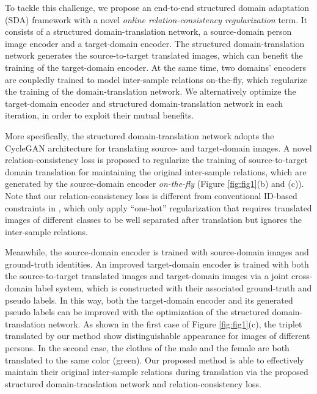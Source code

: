 \documentclass[journal]{IEEEtran}
\begin{document}
To tackle this challenge, we propose an end-to-end structured domain adaptation (SDA) framework with a novel \emph{online relation-consistency regularization} term.
It consists of a structured domain-translation network, a source-domain person image encoder and a target-domain encoder.
The structured domain-translation network generates the source-to-target translated images, which can benefit the training of the target-domain encoder.
At the same time, two domains' encoders are coupledly trained to model inter-sample relations on-the-fly, which regularize the training of the domain-translation network.
We alternatively optimize the target-domain encoder and structured domain-translation network in each iteration, in order to exploit their mutual benefits.

More specifically, the structured domain-translation network adopts the CycleGAN \cite{zhu2017unpaired} architecture for translating source- and target-domain images.
A novel relation-consistency loss is proposed to regularize the training of source-to-target domain translation for maintaining the original inter-sample relations, which are generated by the source-domain encoder \textit{on-the-fly} (Figure \ref{fig:fig1}(b) and (c)).
Note that our relation-consistency loss is different from conventional ID-based constraints in \cite{deng2018image,wei2018person,deng2018similarity,chen2019instance,tang2020cgan}, which only apply  {``one-hot''} regularization that requires translated images of different classes to be well separated after translation  {but ignores the inter-sample relations}.


Meanwhile, the source-domain encoder is trained with source-domain images and ground-truth identities.
An improved target-domain encoder is trained with both the source-to-target translated images and target-domain images via a joint cross-domain label system, which is constructed with their associated ground-truth and pseudo labels. In this way, both the target-domain encoder and its generated pseudo labels can be improved with the optimization of the structured domain-translation network.
 {As shown in the first case of Figure \ref{fig:fig1}(c), the triplet translated by our method show distinguishable appearance for images of different persons. In the second case, the clothes of the male and the female are both translated to the same color (green). Our proposed method is able to effectively maintain their original inter-sample relations during translation via the proposed structured domain-translation network and relation-consistency loss.}
\end{document}
